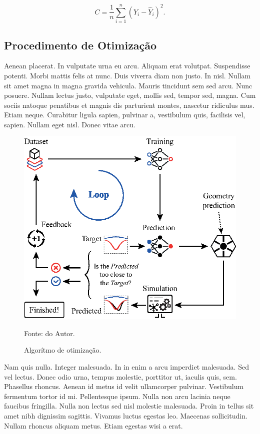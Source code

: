 \begin{equation}
\label{eq:costFunction}
C = \frac{1}{n}\sum_{i=1}^{n}\left ( Y_{i} - \hat{Y}_{i} \right )^{2}.
\end{equation}


\subsection{Procedimento de Otimização}

Aenean placerat. In vulputate urna eu arcu. Aliquam erat volutpat. Suspendisse potenti. Morbi mattis felis at nunc. Duis viverra diam non justo. In nisl. Nullam sit amet magna in magna gravida vehicula. Mauris tincidunt sem sed arcu. Nunc posuere. Nullam lectus justo, vulputate eget, mollis sed, tempor sed, magna. Cum sociis natoque penatibus et magnis dis parturient montes, nascetur ridiculus mus. Etiam neque. Curabitur ligula sapien, pulvinar a, vestibulum quis, facilisis vel, sapien. Nullam eget nisl. Donec vitae arcu.

\begin{figure}[H]
    \centering
    \includegraphics{04-Figuras/OptimizationAlgorithm.eps}
    \caption{Algorítmo de otimização.} \par
    Fonte: do Autor.
    \label{figura: OptimizationAlgorithm}
\end{figure}

Nam quis nulla. Integer malesuada. In in enim a arcu imperdiet malesuada. Sed vel lectus. Donec odio urna, tempus molestie, porttitor ut, iaculis quis, sem. Phasellus rhoncus. Aenean id metus id velit ullamcorper pulvinar. Vestibulum fermentum tortor id mi. Pellentesque ipsum. Nulla non arcu lacinia neque faucibus fringilla. Nulla non lectus sed nisl molestie malesuada. Proin in tellus sit amet nibh dignissim sagittis. Vivamus luctus egestas leo. Maecenas sollicitudin. Nullam rhoncus aliquam metus. Etiam egestas wisi a erat.


